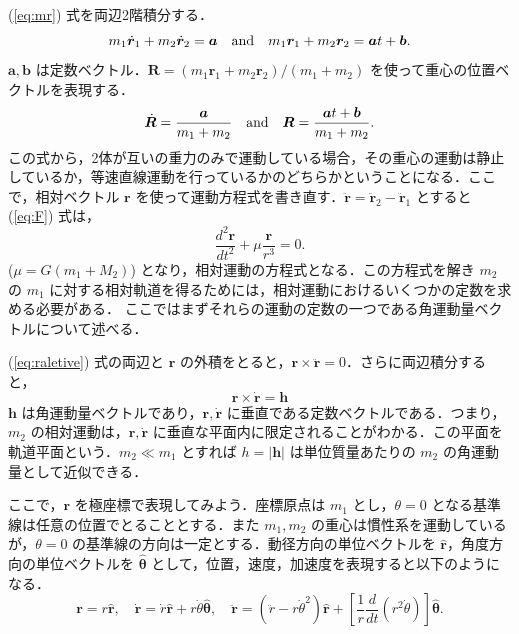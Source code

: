 \documentclass[11pt,a4paper,oneside,onecolumn]{jreport}
\begin{document}
(\ref{eq:mr}) 式を両辺2階積分する．
\begin{equation}
m_1 \dot{{\bm r}}_1 + m_2 \dot{{\bm r}}_2 = {\bm a} \quad {\rm and} \quad m_1 {\bm r}_1 + m_2 {\bm r}_2 = {\bm a} t + {\bm b}.
\end{equation}
${\bm a}, {\bm b}$ は定数ベクトル．${\bm R} = (m_1 {\bm r}_1 + m_2 {\bm r}_2)/(m_1 + m_2)$ を使って重心の位置ベクトルを表現する．
\begin{equation}
\dot{{\bm R}} = \frac{{\bm a}}{m_1 + m_2} \quad {\rm and} \quad {\bm R} = \frac{{\bm a} t + {\bm b}}{m_1 + m_2}.
\end{equation}
この式から，2体が互いの重力のみで運動している場合，その重心の運動は静止しているか，等速直線運動を行っているかのどちらかということになる．ここで，相対ベクトル ${\bm r}$ を使って運動方程式を書き直す．$\ddot{{\bm r}} = \ddot{{\bm r}}_2 - \ddot{{\bm r}}_1$ とすると (\ref{eq:F}) 式は，
\begin{equation}
\frac{d^2 {\bm r}}{dt^2} + \mu \frac{{\bm r}}{r^3} = 0. \label{eq:raletive}
\end{equation}
($\mu = G (m_1 + M_2)$) となり，相対運動の方程式となる．この方程式を解き $m_2$ の $m_1$ に対する相対軌道を得るためには，相対運動におけるいくつかの定数を求める必要がある． ここではまずそれらの運動の定数の一つである角運動量ベクトルについて述べる．

(\ref{eq:raletive}) 式の両辺と ${\bm r}$ の外積をとると，${\bm r} \times \ddot{{\bm r}} = 0$．さらに両辺積分すると，
\begin{equation}
{\bm r} \times \dot{{\bm r}} = {\bm h} \label{eq:angmom}
\end{equation}
${\bm h}$ は角運動量ベクトルであり，${\bm r}, \dot{{\bm r}}$ に垂直である定数ベクトルである．つまり，$m_2$ の相対運動は，${\bm r}, \dot{{\bm r}}$ に垂直な平面内に限定されることがわかる．この平面を軌道平面という．$m_2 \ll m_1$ とすれば $h = |{\bm h}|$ は単位質量あたりの $m_2$ の角運動量として近似できる．

ここで，${\bm r}$ を極座標で表現してみよう．座標原点は $m_1$ とし，$\theta = 0$ となる基準線は任意の位置でとることとする．また $m_1, m_2$ の重心は慣性系を運動しているが，$\theta = 0$ の基準線の方向は一定とする．動径方向の単位ベクトルを $\hat{{\bm r}}$，角度方向の単位ベクトルを $\hat{{\bm \theta}}$ として，位置，速度，加速度を表現すると以下のようになる．
\begin{equation}
{\bm r} = r \hat{{\bm r}}, \quad \dot{{\bm r}} = \dot{r} \hat{{\bm r}} + r \dot{\theta} \hat{{\bm \theta}}, \quad \ddot{{\bm r}} = (\ddot{r} - r \dot{\theta}^2) \hat{{\bm r}} + \left[ \frac{1}{r} \frac{d}{dt} (r^2 \dot{\theta})\right] \hat{{\bm \theta}}. \label{eq:polar}
\end{equation}
\end{document}
